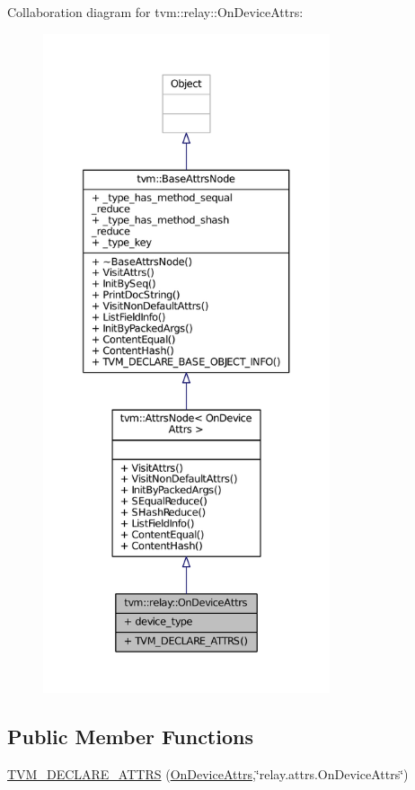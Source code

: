 Collaboration diagram for tvm\+:\+:relay\+:\+:On\+Device\+Attrs\+:
\nopagebreak
\begin{figure}[H]
\begin{center}
\leavevmode
\includegraphics[height=550pt]{structtvm_1_1relay_1_1OnDeviceAttrs__coll__graph}
\end{center}
\end{figure}
\subsection*{Public Member Functions}
\begin{DoxyCompactItemize}
\item 
\hyperlink{structtvm_1_1relay_1_1OnDeviceAttrs_a0b4ba6f91e1c2d7ce354115cc99256a9}{T\+V\+M\+\_\+\+D\+E\+C\+L\+A\+R\+E\+\_\+\+A\+T\+T\+RS} (\hyperlink{structtvm_1_1relay_1_1OnDeviceAttrs}{On\+Device\+Attrs},\char`\"{}relay.\+attrs.\+On\+Device\+Attrs\char`\"{})
\end{DoxyCompactItemize}
